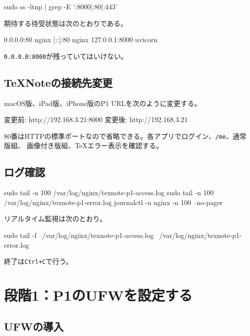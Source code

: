 \documentclass[uplatex,a4paper,11pt]{jsarticle}
\begin{document}
\begin{command}
sudo ss -ltnp | grep -E ':8000|:80|:443'
\end{command}

期待する待受状態は次のとおりである。

\begin{command}
0.0.0.0:80       nginx
[::]:80          nginx
127.0.0.1:8000   uvicorn
\end{command}

\texttt{0.0.0.0:8000}が残っていてはいけない。

\subsection{TeXNoteの接続先変更}

macOS版、iPad版、iPhone版のP1 URLを次のように変更する。

\begin{command}
変更前: http://192.168.3.21:8000
変更後: http://192.168.3.21
\end{command}

80番はHTTPの標準ポートなので省略できる。各アプリでログイン、\texttt{/me}、通常版組、
画像付き版組、TeXエラー表示を確認する。

\subsection{ログ確認}

\begin{command}
sudo tail -n 100 /var/log/nginx/texnote-p1-access.log
sudo tail -n 100 /var/log/nginx/texnote-p1-error.log
journalctl -u nginx -n 100 --no-pager
\end{command}

リアルタイム監視は次のとおり。

\begin{command}
sudo tail -f \
  /var/log/nginx/texnote-p1-access.log \
  /var/log/nginx/texnote-p1-error.log
\end{command}

終了は\texttt{Ctrl+C}で行う。

\newpage
\section{段階1：P1のUFWを設定する}

\subsection{UFWの導入}
\end{document}
